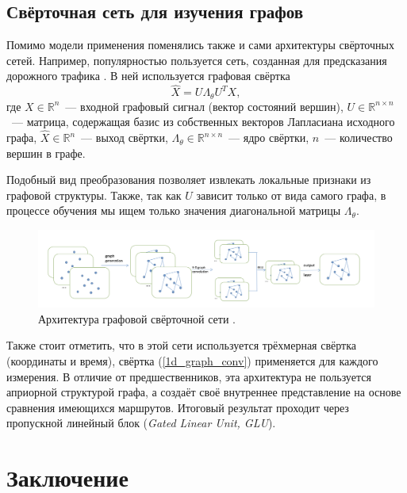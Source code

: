 \documentclass[12pt, fleqn]{article}
\begin{document}
    \subsection{Свёрточная сеть для изучения графов}

    Помимо модели применения поменялись также и сами архитектуры свёрточных сетей. Например, популярностью пользуется 
    сеть, созданная для предсказания дорожного трафика \cite{yu20193d}. В ней используется графовая свёртка
    \begin{equation} \label{1d_graph_conv}
        \hat{X} = U \Lambda_{\theta} U^T X,
    \end{equation}
    \noindent где $X \in \mathbb{R}^n$~--- входной графовый сигнал (вектор состояний вершин), 
    $U \in \mathbb{R}^{n \times n}$~--- матрица, содержащая базис из собственных векторов Лапласиана исходного графа, 
    $\hat{X} \in \mathbb{R}^n$~--- выход свёртки, $\Lambda_{\theta} \in \mathbb{R}^{n \times n}$~--- ядро свёртки, $n$~--- 
    количество вершин в графе.

    Подобный вид преобразования позволяет извлекать локальные признаки из графовой структуры. Также, так как $U$ зависит 
    только от вида самого графа, в процессе обучения мы ищем только значения диагональной матрицы $\Lambda_{\theta}$.

    \begin{figure}[ht]
        \centering
        \includegraphics[scale=0.65]{pics/3D_TGCN.png}
        \caption{Архитектура графовой свёрточной сети \cite{yu20193d}.}
        \label{cnn_3d}
    \end{figure}

    Также стоит отметить, что в этой сети используется трёхмерная свёртка (координаты и время), свёртка (\ref{1d_graph_conv}) 
    применяется для каждого измерения. В отличие от предшественников, эта архитектура не пользуется априорной структурой 
    графа, а создаёт своё внутреннее представление на основе сравнения имеющихся маршрутов. Итоговый результат проходит 
    через пропускной линейный блок (\textit{Gated Linear Unit, GLU}).

    \section{Заключение}
\end{document}
